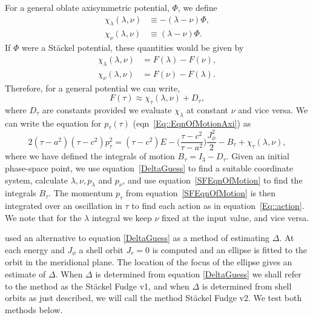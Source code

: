 \documentclass[useAMS,usenatbib,fleqn,a4paper]{mn2e}
\begin{document}
For a general oblate axisymmetric potential,
$\Phi$, we define
\begin{equation}
\begin{split}
\chi_\lambda(\lambda,\nu) &\equiv -(\lambda-\nu)\Phi,\\
\chi_\nu(\lambda,\nu) &\equiv (\lambda-\nu)\Phi.
\end{split}
\end{equation}
If $\Phi$ were a St\"ackel potential, these quantities would be given by
\begin{equation}
\begin{split}
\chi_\lambda(\lambda,\nu) &= F(\lambda)-F(\nu),\\
\chi_\nu(\lambda,\nu) &= F(\nu)-F(\lambda).
\end{split}
\end{equation}
Therefore, for a general potential we can write,
\begin{equation}
F(\tau) \approx \chi_\tau(\lambda,\nu)+D_\tau,
\end{equation}
where $D_\tau$ are constants provided we evaluate $\chi_\lambda$ at constant
$\nu$ and vice versa. We can write the equation for $p_\tau(\tau)$
(eqn~\ref{Eq::EqnOfMotionAxi}) as
\begin{equation}
2(\tau-a^2)(\tau-c^2)p_\tau^2 = (\tau-c^2)E-\Big(\frac{\tau-c^2}{\tau-a^2}\Big)\frac{J_\phi^2}{2}-B_\tau+\chi_\tau(\lambda,\nu),
\label{SFEqnOfMotion}
\end{equation}
where we have defined the integrals of motion $B_\tau = I_3-D_\tau$. Given an
initial phase-space point, we use equation~\eqref{DeltaGuess} to find a
suitable coordinate system, calculate $\lambda,\nu,p_\lambda$ and $p_\nu$,
and use equation~\eqref{SFEqnOfMotion} to find the integrals $B_\tau$. The
momentum $p_\tau$ from equation~\eqref{SFEqnOfMotion} is then integrated over
an oscillation in $\tau$ to find each action as in
equation~\eqref{Eq::action}. We note that for the $\lambda$ integral we keep
$\nu$ fixed at the input value, and vice versa.

\cite{Binney2014_ISO} used an alternative to equation \eqref{DeltaGuess} as a
method of estimating $\Delta$. At each energy and $J_\phi$ a shell orbit $J_r=0$
is computed and an ellipse is fitted to the orbit in the meridional plane.
The location of the focus of the ellipse gives an estimate of $\Delta$. When
$\Delta$ is determined from equation \eqref{DeltaGuess} we shall refer to the
method as the St\"ackel Fudge v1, and when $\Delta$ is determined from shell
orbits as just described, we will call the method St\"ackel Fudge v2.
We test both methods below.
\end{document}
